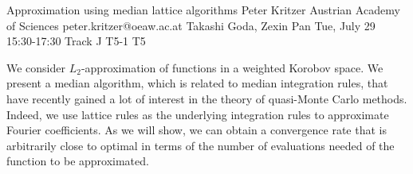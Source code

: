 \begin{talk}
  {Approximation using median lattice algorithms}%
  {Peter Kritzer}%
  {Austrian Academy of Sciences}%
  {peter.kritzer@oeaw.ac.at}%
  {Takashi Goda, Zexin Pan}%
  {}%
  {Tue, July 29 15:30-17:30 Track J}%
  {T5-1}%
  {T5}%
			
We consider $L_2$-approximation of functions in a weighted Korobov space. We present a median algorithm, which is related to median integration rules, that have recently gained a lot of interest in the theory of quasi-Monte Carlo methods. Indeed, we use lattice rules as the underlying integration rules to approximate Fourier coefficients. As we will show, we can obtain a convergence rate that is arbitrarily close to optimal in terms of the number of evaluations needed of the function to be approximated.
\end{talk}
